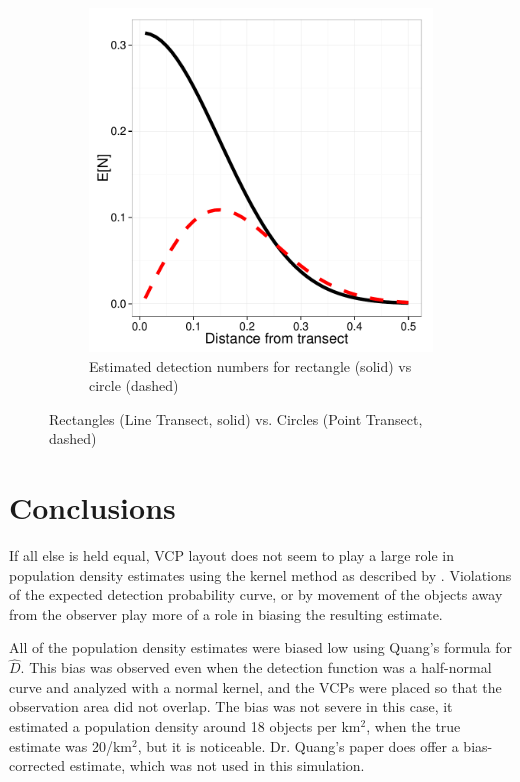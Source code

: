 \documentclass[12pt]{article}
\begin{document}
\begin{figure}
\begin{subfigure}[b]{0.45\textwidth}
		\includegraphics[width=\textwidth]{../images/rect-circ-detection.pdf}
		\caption{Estimated detection numbers for rectangle (solid) vs circle (dashed)}
		\label{fig:perfectCount}
	\end{subfigure}
	\caption{Rectangles (Line Transect, solid) vs. Circles (Point Transect, dashed)}
	\label{fig:linevs}
\end{figure}


\section{Conclusions}
If all else is held equal, VCP layout does not seem to play a large role in population density estimates using the kernel method as described by \textcite{quang1993}. Violations of the expected detection probability curve, or by movement of the objects away from the observer play more of a role in biasing the resulting estimate. 

All of the population density estimates were biased low using Quang's formula for $\hat{D}$. This bias was observed even when the detection function was a half-normal curve and analyzed with a normal kernel, and the VCPs were placed so that the observation area did not overlap. The bias was not severe in this case, it estimated a population density around 18 objects per km$^2$, when the true estimate was 20/km$^2$, but it is noticeable. Dr. Quang's paper does offer a bias-corrected estimate, which was not used in this simulation. 



\printbibliography
%
%
\end{document}
